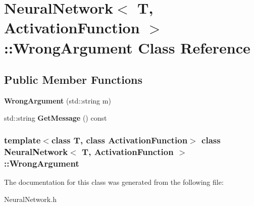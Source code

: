 \hypertarget{class_neural_network_1_1_wrong_argument}{\section{\-Neural\-Network$<$ \-T, \-Activation\-Function $>$\-:\-:\-Wrong\-Argument \-Class \-Reference}
\label{class_neural_network_1_1_wrong_argument}
}
\subsection*{\-Public \-Member \-Functions}
\begin{DoxyCompactItemize}
\item 
\hypertarget{class_neural_network_1_1_wrong_argument_a7dddcaf96b854ada5554b05e0429ea6a}{{\bfseries \-Wrong\-Argument} (std\-::string m)}\label{class_neural_network_1_1_wrong_argument_a7dddcaf96b854ada5554b05e0429ea6a}

\item 
\hypertarget{class_neural_network_1_1_wrong_argument_a708ad656cec99bc65e351dec562c5402}{std\-::string {\bfseries \-Get\-Message} () const }\label{class_neural_network_1_1_wrong_argument_a708ad656cec99bc65e351dec562c5402}

\end{DoxyCompactItemize}
\subsubsection*{template$<$class T, class Activation\-Function$>$ class Neural\-Network$<$ T, Activation\-Function $>$\-::\-Wrong\-Argument}



\-The documentation for this class was generated from the following file\-:\begin{DoxyCompactItemize}
\item 
\-Neural\-Network.\-h\end{DoxyCompactItemize}
